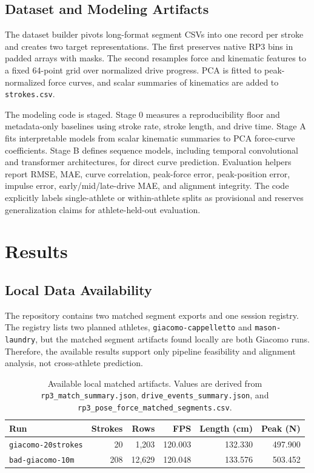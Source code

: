 \documentclass[11pt]{article}
\begin{document}
\subsection{Dataset and Modeling Artifacts}
The dataset builder pivots long-format segment CSVs into one record per stroke and creates two target representations. The first preserves native RP3 bins in padded arrays with masks. The second resamples force and kinematic features to a fixed 64-point grid over normalized drive progress. PCA is fitted to peak-normalized force curves, and scalar summaries of kinematics are added to \texttt{strokes.csv}.

The modeling code is staged. Stage 0 measures a reproducibility floor and metadata-only baselines using stroke rate, stroke length, and drive time. Stage A fits interpretable models from scalar kinematic summaries to PCA force-curve coefficients. Stage B defines sequence models, including temporal convolutional and transformer architectures, for direct curve prediction. Evaluation helpers report RMSE, MAE, curve correlation, peak-force error, peak-position error, impulse error, early/mid/late-drive MAE, and alignment integrity. The code explicitly labels single-athlete or within-athlete splits as provisional and reserves generalization claims for athlete-held-out evaluation.

\section{Results}
\subsection{Local Data Availability}
The repository contains two matched segment exports and one session registry. The registry lists two planned athletes, \texttt{giacomo-cappelletto} and \texttt{mason-laundry}, but the matched segment artifacts found locally are both Giacomo runs. Therefore, the available results support only pipeline feasibility and alignment analysis, not cross-athlete prediction.

\begin{table}[t]
  \centering
  \caption{Available local matched artifacts. Values are derived from \texttt{rp3\_match\_summary.json}, \texttt{drive\_events\_summary.json}, and \texttt{rp3\_pose\_force\_matched\_segments.csv}.}
  \label{tab:artifacts}
  \small
  \begin{tabularx}{\linewidth}{Xrrrrr}
    \toprule
    Run & Strokes & Rows & FPS & Length (cm) & Peak (N) \\
    \midrule
    \texttt{giacomo-20strokes} & 20 & 1,203 & 120.003 & 132.330 & 497.900 \\
    \texttt{bad-giacomo-10m} & 208 & 12,629 & 120.048 & 133.576 & 503.452 \\
    \bottomrule
  \end{tabularx}
\end{table}
\end{document}
